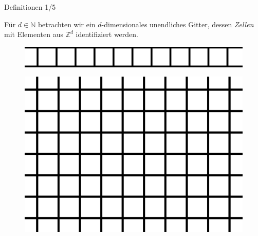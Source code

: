 \documentclass[aspectratio=169]{beamer}
\begin{document}
  \begin{frame}{Definitionen 1/5}
    \begin{definition*}[Zellularraum]
      Für $d \in \mathbb{N}$ betrachten wir ein $d$-dimensionales unendliches Gitter, dessen \textit{Zellen} mit Elementen aus $\mathbb{Z}^d$ identifiziert werden.
    \end{definition*}

    \begin{multicols*}{3}
      \begin{figure}[H]
          \centering
          \includegraphics[width = 0.4 \textheight]{1d_cellspace.png}
      \end{figure}
      \vfill\null
      \columnbreak

      \pause

      \begin{figure}[H]
          \centering
          \includegraphics[width = 0.35 \textheight]{2d_cellspace.png}
      \end{figure}
      \vfill\null
      \columnbreak

      \pause


\end{multicols*}
\end{frame}
\end{document}
